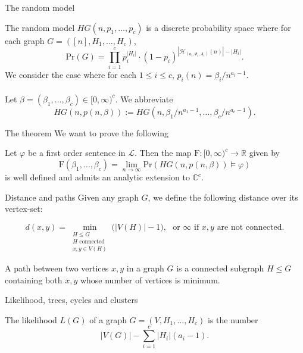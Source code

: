 \documentclass[11pt]{beamer}
\newcommand{\CC}{\mathbb{C}}
\newcommand{\R}{\mathbb{R}}
\newcommand{\Ln}{\lim\limits_{n\to \infty}}
\begin{document}
	\begin{frame}{The random model}

	The random model $HG(n,p_1,\dots, p_c)$ is a discrete probability space where for each graph 
	$G=([n],H_1,\dots,H_c)$,
	\[ \mathrm{Pr}(G)=\prod_{i=1}^{c} p_i^{|H_i|}\cdot (1-p_i)^{|\mathcal{H}_{(a_i,\Phi_i,A_i)}(n)|-|H_i|} . \]
	We consider the case where for each $1\leq i \leq c$,  $p_i(n)=\beta_i/n^{a_i-1}$.
	\\~\\ 
	Let $\beta=(\beta_1,\dots, \beta_c)\in [0,\infty)^c$. We abbreviate
	\[HG(n,p(n,\beta)):= HG(n,\beta_1/n^{a_1-1},\dots, \beta_c/n^{a_c-1}). \]
	
	\end{frame}
	
	\begin{frame}{The theorem}
		We want to prove the following
		
		\begin{theorem} Let $\varphi$ be a first order sentence in $\mathcal{L}$.
			Then the map $\mathrm{F}:[0,\infty)^c\rightarrow \R$ given by
			\[ \mathrm{F}(\beta_1,\dots, \beta_c)= \Ln 
			\mathrm{Pr}(HG(n,p(n,\beta))\models \varphi )
			\]
			is well defined and admits an analytic extension to $\CC^c$. 
		\end{theorem}
		
	\end{frame}
	
	\begin{frame}{Distance and paths}
		Given any graph $G$, we define the following distance over its vertex-set:
			
			\begin{equation*}d(x,y)= \min_{\substack{H \leq G\\ 
					H \text{ connected }\\
					x,y\in V(H)}} \big(|V(H)| - 1 \big), \, \, \text{ or } \infty \text{ if }
				x,y \text{ are not connected.}
			\end{equation*}
		
		\begin{definition} 
			A path between two vertices $x,y$ in a graph $G$ is
			a connected subgraph $H\leq G$ containing both $x,y$ whose
			number of vertices is minimum. 
		\end{definition}
		
	\end{frame}
	\begin{frame}{Likelihood, trees, cycles and clusters} 
		\begin{definition}
			The likelihood $L(G)$ of a graph $G=(V,H_1,\dots,H_c)$ is
			the number
			\[ |V(G)| - \sum_{i=1}^c |H_i|(a_i-1).\]
		\end{definition}
	~\\
	\end{frame}
\end{document}
